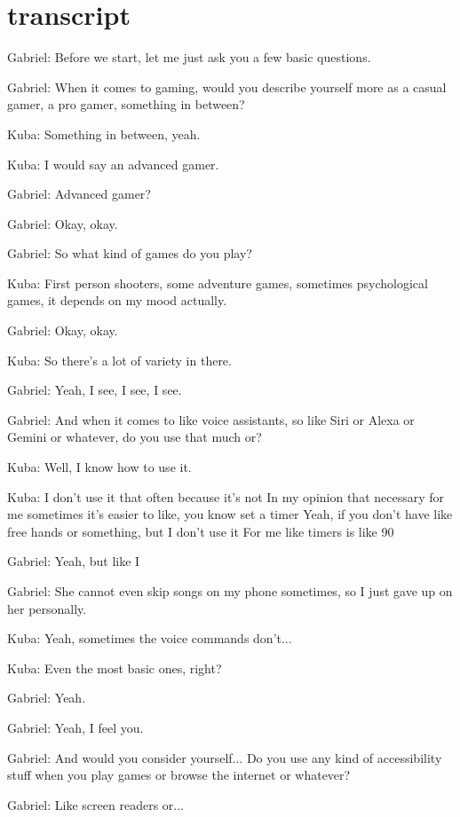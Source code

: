 
\section{transcript}

Gabriel: Before we start, let me just ask you a few basic questions.

Gabriel: When it comes to gaming, would you describe yourself more as a casual gamer, a pro gamer, something in between?

Kuba: Something in between, yeah.

Kuba: I would say an advanced gamer.

Gabriel: Advanced gamer?

Gabriel: Okay, okay.

Gabriel: So what kind of games do you play?

Kuba: First person shooters, some adventure games, sometimes psychological games, it depends on my mood actually.

Gabriel: Okay, okay.

Kuba: So there's a lot of variety in there.

Gabriel: Yeah, I see, I see, I see.

Gabriel: And when it comes to like voice assistants, so like Siri or Alexa or Gemini or whatever, do you use that much or?

Kuba: Well, I know how to use it.

Kuba: I don't use it that often because it's not In my opinion that necessary for me sometimes it's easier to like, you know set a timer Yeah, if you don't have like free hands or something, but I don't use it For me like timers is like 90%

Gabriel: Yeah, but like I

Gabriel: She cannot even skip songs on my phone sometimes, so I just gave up on her personally.

Kuba: Yeah, sometimes the voice commands don't...

Kuba: Even the most basic ones, right?

Gabriel: Yeah.

Gabriel: Yeah, I feel you.

Gabriel: And would you consider yourself... Do you use any kind of accessibility stuff when you play games or browse the internet or whatever?

Gabriel: Like screen readers or...

